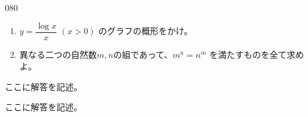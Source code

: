 \begin{prob}{080}{}{}
 \begin{enumerate}
  \item $y=\dfrac{\log x}{x}$ $(x>0)$ のグラフの概形をかけ。
  \item 異なる二つの自然数$m, n$の組であって、$m^n=n^m$ を満たすものを全て求めよ。
 \end{enumerate}
\end{prob}
ここに解答を記述。

ここに解答を記述。